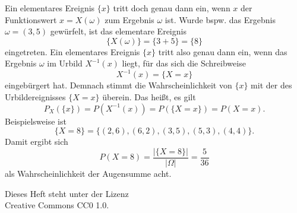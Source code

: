 \documentclass[a4paper,10pt,fleqn,twocolumn,twoside,dvipdfmx]{scrartcl}
\theoremstyle{rmbox}
\begin{document}
Ein elementares Ereignis $\{x\}$ tritt doch genau dann ein,
wenn $x$ der Funktionswert $x=X(\omega)$ zum Ergebnis
$\omega$ ist. Wurde bspw. das Ergebnis $\omega=(3, 5)$
gewürfelt, ist das elementare Ereignis%
\[\{X(\omega)\} = \{3 + 5\} = \{8\}\]
eingetreten.
Ein elementares Ereignis $\{x\}$ tritt also genau dann ein, wenn das
Ergebnis $\omega$ im Urbild $X^{-1}(x)$ liegt, für das sich die
Schreibweise%
\[X^{-1}(x)=\{X=x\}\]
eingebürgert hat. Demnach stimmt die Wahrscheinlichkeit von $\{x\}$
mit der des Urbildereignisses $\{X=x\}$ überein. Das heißt, es gilt%
\[P_X(\{x\}) = P(X^{-1}(x)) = P(\{X=x\}) = P(X=x).\]
Beispielsweise ist
\[\{X=8\} = \{(2,6), (6,2), (3,5), (5,3), (4,4)\}.\]
Damit ergibt sich
\[P(X=8) = \frac{|\{X=8\}|}{|\Omega|} = \frac{5}{36}\]
als Wahrscheinlichkeit der Augensumme acht.


\vfill\noindent
Dieses Heft steht unter der Lizenz\\
Creative Commons CC0 1.0.
\end{document}
